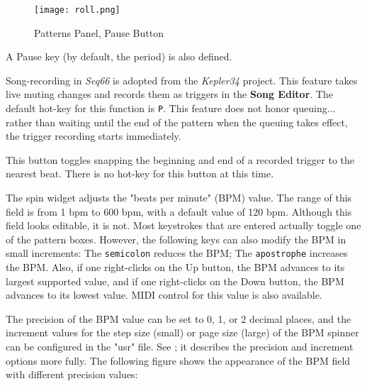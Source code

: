 \begin{figure}[H]
   \centering 
   \texttt{[image: roll.png]}
   \caption{Patterns Panel, Pause Button}
   \label{fig:pattern_window_pause_button}
\end{figure}

   A Pause key (by default, the period) is also defined.

   Song-recording in \textsl{Seq66} is adopted from the
   \textsl{Kepler34} project.
   This feature takes live muting changes and records them as
   triggers in the \textbf{Song Editor}.
   The default hot-key for this function is \texttt{P}.
   This feature does not honor queuing...
   rather than waiting until the end of the pattern when the queuing takes
   effect, the trigger recording starts immediately.

   This button toggles snapping the beginning and end of a recorded trigger to
   the nearest beat.  There is no hot-key for this button at this time.

   The spin widget adjusts the "beats per minute" (BPM) value.  The
   range of this field is from 1 bpm to 600 bpm, with a default value of
   120 bpm.
   Although this field looks editable, it is not.  Most keystrokes
   that are entered actually toggle one of the pattern boxes.
   However, the following keys can also modify the BPM in small increments:
   The \texttt{semicolon} reduces the BPM;
   The \texttt{apostrophe} increases the BPM.
   Also, if one right-clicks on the Up button, the BPM advances to its largest
   supported value, and if one right-clicks on the Down button, the BPM
   advances to its lowest value.
   MIDI control for this value is also available.

   The precision of the BPM value can be set to 0, 1, or 2
   decimal places, and the increment values for the step size (small)
   or page size (large) of the BPM spinner can be configured in the "usr" file.
   See ; it describes
   the precision and increment options more fully.
   The following figure shows the appearance of the BPM field with different
   precision values:

